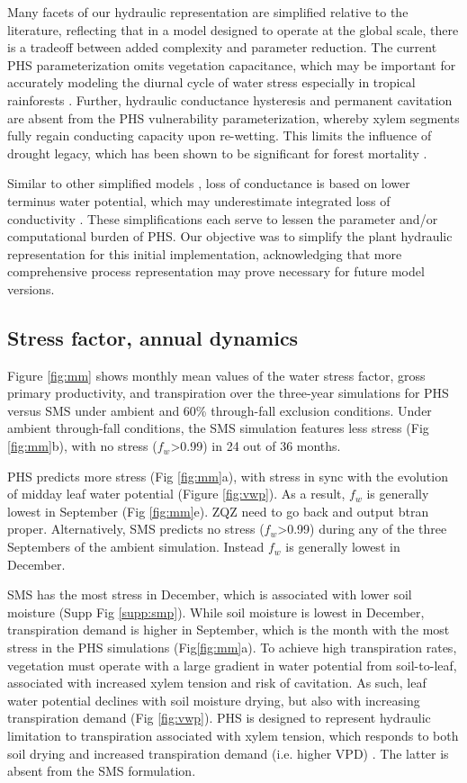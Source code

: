 \documentclass[draft,linenumbers]{agujournal}
\begin{document}
    Many facets of our hydraulic representation are simplified relative to the literature, reflecting that in a model designed to operate at the global scale,  there is a tradeoff between added complexity and parameter reduction. The current PHS parameterization omits vegetation capacitance,  which may be important for accurately modeling the diurnal cycle of water stress especially in tropical rainforests \citep{meinzer2009}. Further, hydraulic conductance hysteresis and permanent cavitation are absent from the PHS vulnerability parameterization, whereby xylem segments fully regain conducting capacity upon re-wetting. This limits the influence of drought legacy, which has been shown to be significant for forest mortality \citep{anderegg2013}.
    
    Similar to other simplified models \citep{xu2016}, loss of conductance is based on lower terminus water potential, which may underestimate integrated loss of conductivity \citep{sperry2015}. These simplifications each serve to lessen the parameter and/or computational burden of PHS. Our objective was to simplify the plant hydraulic representation for this initial implementation, acknowledging that more comprehensive process representation may prove necessary for future model versions.

\subsection{Stress factor, annual dynamics}
    
    Figure \ref{fig:mm} shows monthly mean values of the water stress factor, gross primary productivity, and transpiration over the three-year simulations for PHS versus SMS under ambient and 60\% through-fall exclusion conditions. Under ambient through-fall conditions, the SMS simulation features less stress (Fig \ref{fig:mm}b), with no stress ($f_w$>0.99) in 24 out of 36 months.
    
    PHS predicts more stress (Fig \ref{fig:mm}a), with stress in sync with the evolution of midday leaf water potential (Figure \ref{fig:vwp}). As a result, $f_w$ is generally lowest in September (Fig \ref{fig:mm}e). ZQZ need to go back and output btran proper.
    Alternatively, SMS predicts no stress ($f_w$>0.99) during any of the three Septembers of the ambient simulation. Instead $f_w$ is generally lowest in December.
    
    SMS has the most stress in December, which is associated with lower soil moisture (Supp Fig \ref{supp:smp}). While soil moisture is lowest in December, transpiration demand is higher in September, which is the month with the most stress in the PHS simulations (Fig\ref{fig:mm}a). To achieve high transpiration rates, vegetation must operate with a large gradient in water potential from soil-to-leaf, associated with increased xylem tension and risk of cavitation. As such, leaf water potential declines with soil moisture drying, but also with increasing transpiration demand (Fig \ref{fig:vwp}). PHS is designed to represent hydraulic limitation to transpiration associated with xylem tension, which responds to both soil drying and increased transpiration demand (i.e. higher VPD) \citep{sperry2015}. The latter is absent from the SMS formulation.
    
\end{document}
